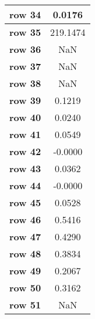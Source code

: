 \documentclass{article}
\begin{document}
{\begin{tabular}{|l|c|}
\textbf{row 34} & 0.0176 \\ \hline
\textbf{row 35} & 219.1474 \\ \hline
\textbf{row 36} & NaN \\ \hline
\textbf{row 37} & NaN \\ \hline
\textbf{row 38} & NaN \\ \hline
\textbf{row 39} & 0.1219 \\ \hline
\textbf{row 40} & 0.0240 \\ \hline
\textbf{row 41} & 0.0549 \\ \hline
\textbf{row 42} & -0.0000 \\ \hline
\textbf{row 43} & 0.0362 \\ \hline
\textbf{row 44} & -0.0000 \\ \hline
\textbf{row 45} & 0.0528 \\ \hline
\textbf{row 46} & 0.5416 \\ \hline
\textbf{row 47} & 0.4290 \\ \hline
\textbf{row 48} & 0.3834 \\ \hline
\textbf{row 49} & 0.2067 \\ \hline
\textbf{row 50} & 0.3162 \\ \hline
\textbf{row 51} & NaN \\ \hline
\end{tabular}
}
\end{document}
